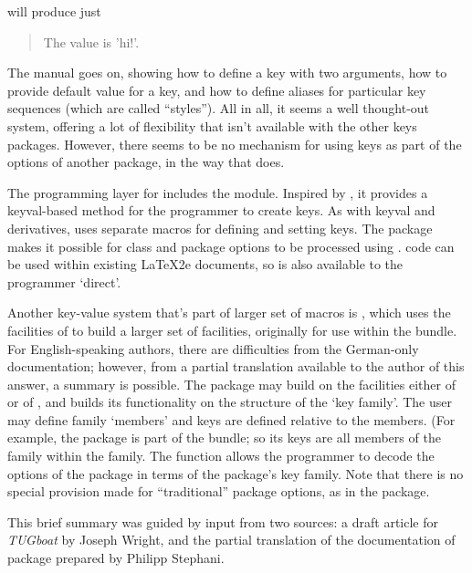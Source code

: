 will produce just
\begin{quote}
  The value is 'hi!'.
\end{quote}
The manual goes on, showing how to define a key with two arguments,
how to provide default value for a key, and how to define aliases for
particular key sequences (which are called ``styles'').  All in all,
it seems a well thought-out system, offering a lot of flexibility that
isn't available with the other keys packages.  However, there seems to
be no mechanism for using  keys as part of the
options of another package, in the way that  does.

The  programming layer for 
includes the  module.  Inspired by ,
it provides a keyval-based method for the programmer to create keys.
As with keyval and derivatives,  uses separate macros
for defining and setting keys.  The package  makes
it possible for \latexe{} class and package
options to be processed using . 
code can be used within existing LaTeX2e documents, so
 is also available to the \latexe{} programmer `direct'.

Another key-value system that's part of larger set of macros is
, which uses the facilities of  to
build a larger set of facilities, originally for use within the
 bundle.  For English-speaking authors, there are
difficulties from the German-only documentation; however, from a
partial translation available to the author of this answer, a summary
is possible.  The package may build on the facilities either of
 or of , and builds its functionality
on the structure of the `key family'.  The user may define family
`members' and keys are defined relative to the members.  (For example,
the package  is part of the 
bundle; so its keys are all members of the 
family within the  family.  The function
 allows the programmer to decode the options
of the package in terms of the package's key family.  Note that there
is no special provision made for ``traditional'' package options, as
in the  package.

This brief summary was guided by input from two sources: a draft article
for \textsl{TUGboat} by Joseph Wright, and the partial translation of the
documentation of package  prepared by Philipp
Stephani.

